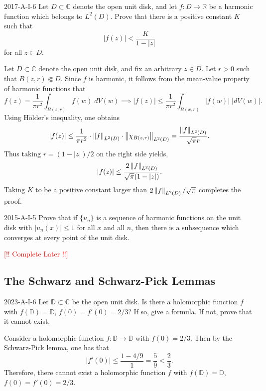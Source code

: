 \documentclass{article}
\begin{document}
	\begin{prb}{2017-A-I-6}
		Let $D \subset \mathbb{C}$ denote the open unit disk, and let $f: D \to \mathbb{R}$ be a harmonic function which belongs to $L^{2}(D)$. Prove that there is a positive constant $K$ such that 
		\begin{equation*}
			|f(z)| < \frac{K}{1 - |z|}
		\end{equation*}
		for all $z \in D$. 
	\end{prb}
	Let $D \subset \mathbb{C}$ denote the open unit disk, and fix an arbitrary $z \in D$. Let $r > 0$ such that $B(z, r) \Subset D$. Since $f$ is harmonic, it follows from the mean-value property of harmonic functions that 
	\begin{equation*}
		f(z) = \frac{1}{\pi r^{2}}\int_{B(z, r)}f(w)\;dV(w) \implies |f(z)| \leq \frac{1}{\pi r^{2}}\int_{B(x, r)}|f(w)|\;|dV(w)|. 
	\end{equation*}
	Using H\"older's inequality, one obtains 
	\begin{equation*}
		|f(z)| \leq \frac{1}{\pi r^{2}} \cdot \left\Vert f \right\Vert_{L^{2}(D)} \cdot \left\Vert \chi_{B(z, r)} \right\Vert_{L^{2}(D)} = \frac{\left\Vert f \right\Vert_{L^{2}(D)}}{\sqrt{\pi}r}. 
	\end{equation*}
	Thus taking $r = (1 - |z|)/2$ on the right side yields, 
	\begin{equation*}
		|f(z)| \leq \frac{2\left\Vert f \right\Vert_{L^{2}(D)}}{\sqrt{\pi}(1 - |z|)}. 
	\end{equation*}
	Taking $K$ to be a positive constant larger than $2\left\Vert f \right\Vert_{L^{2}(D)}/\sqrt{\pi}$ completes the proof. 
	
	\begin{prb}{2015-A-I-5}
		Prove that if $\{u_{n}\}$ is a sequence of harmonic functions on the unit disk with $|u_{n}(x)| \leq 1$ for all $x$ and all $n$, then there is a subsequence which converges at every point of the unit disk. 
	\end{prb}
	\textcolor{red}{[!! Complete Later !!]} 
	
	\subsection{The Schwarz and Schwarz-Pick Lemmas}
	
	\begin{prb}{2023-A-I-6}
		Let $\mathbb{D} \subset \mathbb{C}$ be the open unit disk. Is there a holomorphic function $f$ with $f(\mathbb{D}) = \mathbb{D}$, $f(0) = f'(0) = 2/3$? If so, give a formula. If not, prove that it cannot exist. 
	\end{prb}
	Consider a holomorphic function $f: \mathbb{D} \to \mathbb{D}$ with $f(0) = 2/3$. Then by the Schwarz-Pick lemma, one has that 
	\begin{equation*}
		|f'(0)| \leq \frac{1 - 4/9}{1} = \frac{5}{9} < \frac{2}{3}. 
	\end{equation*}
	Therefore, there cannot exist a holomorphic function $f$ with $f(\mathbb{D}) = \mathbb{D}$, $f(0) = f'(0) = 2/3$. 
	
\end{document}
